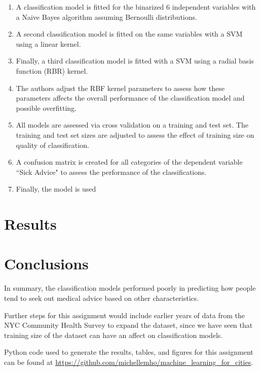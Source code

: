 \documentclass[10pt,twocolumn]{article}
\begin{document}
\begin{enumerate}
\item A classification model is fitted for the binarized 6 independent variables with
a Naive Bayes algorithm assuming Bernoulli distributions.
\item A second classification model is fitted on the same variables with
a SVM using a linear kernel.
\item Finally, a third classification model is fitted with a SVM using a radial basis
function (RBR) kernel.
\item The authors adjust the RBF kernel parameters to assess how these parameters
affects the overall performance of the classification model and possible overfitting.
\item All models are assessed via cross validation on a training and test set. The training
and test set sizes are adjusted to assess the effect of training size on quality
of classification.
\item A confusion matrix is created for all categories of the dependent variable
``Sick Advice" to assess the performance of the classifications.
\item Finally, the model is used
\end{enumerate}


\section{Results}

\section{Conclusions}

In summary, the classification models performed poorly in predicting
how people tend to seek out medical advice based on other characteristics.

Further steps for this assignment would include earlier years of data from the
NYC Community Health Survey to expand the dataset, since we have seen that training
size of the dataset can have an affect on classification models.

Python code used to generate the results, tables, and figures for this assignment can be
found at \url{https://github.com/michellemho/machine_learning_for_cities}.
\end{document}
